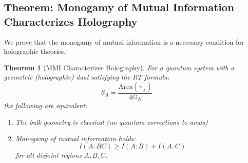 \documentclass[12pt,a4paper]{article}
\newtheorem{theorem}{Theorem}[section]
\begin{document}
\subsection{Theorem: Monogamy of Mutual Information Characterizes Holography}

We prove that the monogamy of mutual information is a necessary condition for holographic theories.

\begin{theorem}[MMI Characterizes Holography]\label{thm:mmi}
For a quantum system with a geometric (holographic) dual satisfying the RT formula:
\begin{equation}
S_A = \frac{\text{Area}(\gamma_A)}{4G_N}
\end{equation}
the following are equivalent:
\begin{enumerate}
    \item The bulk geometry is classical (no quantum corrections to areas)
    \item Monogamy of mutual information holds:
    \begin{equation}
    I(A:BC) \geq I(A:B) + I(A:C)
    \end{equation}
    for all disjoint regions $A, B, C$.
\end{enumerate}
\end{theorem}
\end{document}
